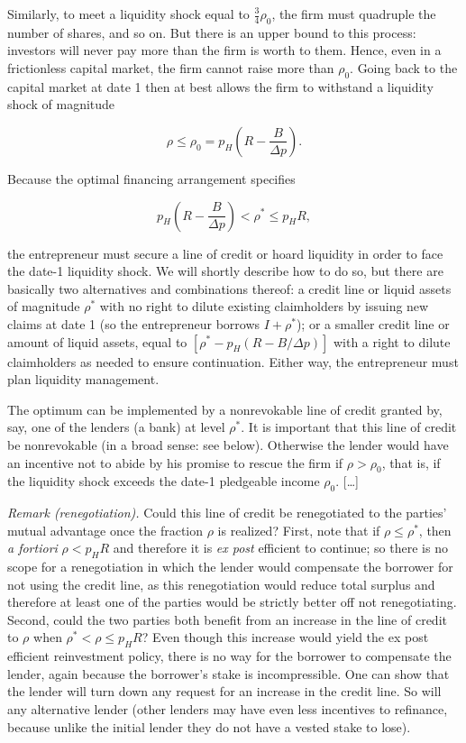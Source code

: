\documentclass[11pt,a4paper]{article}
\begin{document}
Similarly, to meet a liquidity shock equal to \(\frac34\rho_0\), the firm must quadruple the number
of shares, and so on. But there is an upper bound to this process: investors will never pay more
than the firm is worth to them. Hence, even in a frictionless capital market, the firm cannot raise
more than \(\rho_0\). Going back to the capital market at date 1 then at best allows the firm to
withstand a liquidity shock of magnitude

\[\rho \leqslant \rho_0 = p_H\left(R - \frac{B}{\Delta p}\right).\]

Because the optimal financing arrangement specifies

\[p_H\left(R - \frac{B}{\Delta p}\right) < \rho^* \leqslant p_HR,\]

the entrepreneur must secure a line of credit or hoard liquidity in order to face the date-1
liquidity shock. We will shortly describe how to do so, but there are basically two alternatives and
combinations thereof: a credit line or liquid assets of magnitude \(\rho^*\) with no right to dilute
existing claimholders by issuing new claims at date 1 (so the entrepreneur borrows \(I + \rho^*\));
or a smaller credit line or amount of liquid assets, equal to \([\rho^* - p_H(R - B/\Delta p)]\)
with a right to dilute claimholders as needed to ensure continuation. Either way, the entrepreneur
must plan liquidity management.

The optimum can be implemented by a nonrevokable line of credit granted by, say, one of the lenders
(a bank) at level \(\rho^*\). It is important that this line of credit be nonrevokable (in a broad
sense: see below). Otherwise the lender would have an incentive not to abide by his promise to
rescue the firm if \(\rho > \rho_0\), that is, if the liquidity shock exceeds the date-1 pledgeable
income \(\rho_0\). {[}\ldots{]}

\emph{Remark (renegotiation).} Could this line of credit be renegotiated to the parties' mutual
advantage once the fraction \(\rho\) is realized? First, note that if \(\rho \leqslant \rho^*\),
then \emph{a fortiori} \(\rho < p_HR\) and therefore it is \emph{ex post} efficient to continue; so
there is no scope for a renegotiation in which the lender would compensate the borrower for not
using the credit line, as this renegotiation would reduce total surplus and therefore at least one
of the parties would be strictly better off not renegotiating. Second, could the two parties both
benefit from an increase in the line of credit to \(\rho\) when \(\rho^* < \rho \leqslant p_HR\)?
Even though this increase would yield the ex post efficient reinvestment policy, there is no way for
the borrower to compensate the lender, again because the borrower's stake is incompressible. One can
show that the lender will turn down any request for an increase in the credit line. So will any
alternative lender (other lenders may have even less incentives to refinance, because unlike the
initial lender they do not have a vested stake to lose).
\end{document}
